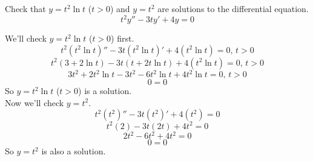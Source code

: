 \begin{example}
	Check that $y = t^2\ln{t}$ ($t > 0$) and $y = t^2$  are solutions to the differential equation.
	\begin{equation*}
		t^2y'' - 3ty' + 4y = 0
	\end{equation*}
\end{example}
\noindent
We'll check $y= t^2\ln{t}$ ($t > 0$) first.
\begin{equation*}
	t^2\left(t^2\ln{t}\right)'' - 3t\left(t^2\ln{t}\right)' + 4\left(t^2\ln{t}\right) = 0 \text{, } t > 0
\end{equation*}
\begin{equation*}
	t^2\left(3 + 2\ln{t}\right) - 3t\left(t + 2t\ln{t}\right) + 4\left(t^2\ln{t}\right) = 0 \text{, } t > 0
\end{equation*}
\begin{equation*}
	3t^2 + 2t^2\ln{t} - 3t^2 - 6t^2\ln{t} + 4t^2\ln{t} = 0 \text{, } t > 0
\end{equation*}
\begin{equation*}
	0 = 0
\end{equation*}
So $y = t^2\ln{t}$ ($t > 0$) is a solution.\\
Now we'll check $y= t^2$.
\begin{equation*}
	t^2\left(t^2\right)'' - 3t\left(t^2\right)' + 4\left(t^2\right) = 0
\end{equation*}
\begin{equation*}
	t^2\left(2\right) - 3t\left(2t\right) + 4t^2 = 0
\end{equation*}
\begin{equation*}
	2t^2 - 6t^2 + 4t^2 = 0
\end{equation*}
\begin{equation*}
	0 = 0
\end{equation*}
So $y = t^2$ is also a solution.